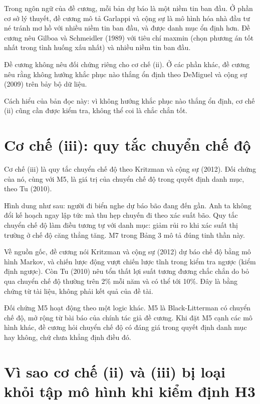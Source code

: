 Trong ngôn ngữ của đề cương, mỗi bản dự báo là một niềm tin ban đầu. Ở phần cơ sở lý thuyết, đề cương mô tả Garlappi và cộng sự là mô hình hóa nhà đầu tư né tránh mơ hồ với nhiều niềm tin ban đầu, và được danh mục ổn định hơn. Đề cương nêu Gilboa và Schmeidler (1989) với tiêu chí maxmin (chọn phương án tốt nhất trong tình huống xấu nhất) và nhiều niềm tin ban đầu.

Đề cương không nêu đối chứng riêng cho cơ chế (ii). Ở các phần khác, đề cương nêu rằng không hướng khắc phục nào thắng ổn định theo DeMiguel và cộng sự (2009) trên bảy bộ dữ liệu.

Cách hiểu của bản đọc này: vì không hướng khắc phục nào thắng ổn định, cơ chế (ii) cũng cần được kiểm tra, không thể coi là chắc chắn tốt.

\section{Cơ chế (iii): quy tắc chuyển chế độ}

Cơ chế (iii) là quy tắc chuyển chế độ theo Kritzman và cộng sự (2012). Đối chứng của nó, cùng với M5, là giá trị của chuyển chế độ trong quyết định danh mục, theo Tu (2010).

Hình dung như sau: người đi biển nghe dự báo bão đang đến gần. Anh ta không đổi kế hoạch ngay lập tức mà thu hẹp chuyến đi theo xác suất bão. Quy tắc chuyển chế độ làm điều tương tự với danh mục: giảm rủi ro khi xác suất thị trường ở chế độ căng thẳng tăng. M7 trong Bảng 3 mô tả đúng tinh thần này.

Về nguồn gốc, đề cương nói Kritzman và cộng sự (2012) dự báo chế độ bằng mô hình Markov, và chiến lược động vượt chiến lược tĩnh trong kiểm tra ngược (kiểm định ngược). Còn Tu (2010) nêu tổn thất lợi suất tương đương chắc chắn do bỏ qua chuyển chế độ thường trên 2\% mỗi năm và có thể tới 10\%. Đây là bằng chứng từ tài liệu, không phải kết quả của đề tài.

Đối chứng M5 hoạt động theo một logic khác. M5 là Black-Litterman có chuyển chế độ, mở rộng từ bài báo của chính tác giả đề cương. Khi đặt M5 cạnh các mô hình khác, đề cương hỏi chuyển chế độ có đáng giá trong quyết định danh mục hay không, chứ chưa khẳng định điều đó.

\section{Vì sao cơ chế (ii) và (iii) bị loại khỏi tập mô hình khi kiểm định H3}

